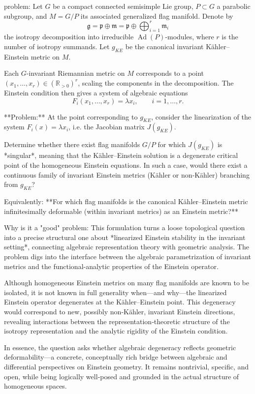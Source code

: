 problem:  
Let \( G \) be a compact connected semisimple Lie group, \( P \subset G \) a parabolic subgroup, and \( M = G/P \) its associated generalized flag manifold. Denote by  
\[
\mathfrak{g} = \mathfrak{p} \oplus \mathfrak{m} = \mathfrak{p} \oplus \bigoplus_{i=1}^r \mathfrak{m}_i
\]
the isotropy decomposition into irreducible \( \operatorname{Ad}(P) \)-modules, where \( r \) is the number of isotropy summands.  
Let \( g_{KE} \) be the canonical invariant Kähler–Einstein metric on \( M \).  

Each \( G \)-invariant Riemannian metric on \( M \) corresponds to a point \( (x_1, \dots, x_r) \in (\mathbb{R}_{>0})^r \), scaling the components in the decomposition. The Einstein condition then gives a system of algebraic equations
\[
F_i(x_1, \dots, x_r) = \lambda x_i, \qquad i = 1, \dots, r.
\]

**Problem:**  
At the point corresponding to \( g_{KE} \), consider the linearization of the system \( F_i(x) = \lambda x_i \), i.e. the Jacobian matrix \(J(g_{KE})\).  

Determine whether there exist flag manifolds \(G/P\) for which \(J(g_{KE})\) is *singular*, meaning that the Kähler–Einstein solution is a degenerate critical point of the homogeneous Einstein equations. In such a case, would there exist a continuous family of invariant Einstein metrics (Kähler or non‑Kähler) branching from \(g_{KE}\)?  

Equivalently: **For which flag manifolds is the canonical Kähler–Einstein metric infinitesimally deformable (within invariant metrics) as an Einstein metric?**

Why is it a "good" problem:  
This formulation turns a loose topological question into a precise structural one about *linearized Einstein stability in the invariant setting*, connecting algebraic representation theory with geometric analysis. The problem digs into the interface between the algebraic parametrization of invariant metrics and the functional-analytic properties of the Einstein operator.  

Although homogeneous Einstein metrics on many flag manifolds are known to be isolated, it is not known in full generality when—and why—the linearized Einstein operator degenerates at the Kähler–Einstein point. This degeneracy would correspond to new, possibly non‑Kähler, invariant Einstein directions, revealing interactions between the representation‑theoretic structure of the isotropy representation and the analytic rigidity of the Einstein condition.  

In essence, the question asks whether algebraic degeneracy reflects geometric deformability—a concrete, conceptually rich bridge between algebraic and differential perspectives on Einstein geometry. It remains nontrivial, specific, and open, while being logically well‑posed and grounded in the actual structure of homogeneous spaces.